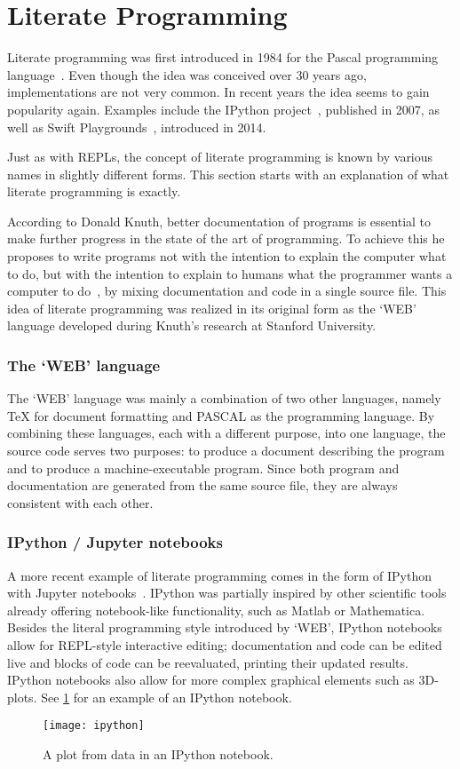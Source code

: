 \section{Literate Programming}
\label{sec:literate-programming}

Literate programming was first introduced in 1984 for the Pascal programming
language~\cite{knuth1984}. Even though the idea was conceived over 30 years
ago, implementations are not very common. In recent years the idea seems to
gain popularity again. Examples include the IPython project~\cite{ipython2007},
published in 2007, as well as Swift Playgrounds~\cite{swift-playgrounds},
introduced in 2014.

Just as with REPLs, the concept of literate programming is known by various
names in slightly different forms. This section starts with an explanation of
what literate programming is exactly.

According to Donald Knuth, better documentation of programs is essential to make
further progress in the state of the art of programming.
To achieve this he proposes to write programs not with the intention to
explain the computer what to do, but with the intention to explain to humans
what the programmer wants a computer to do~\cite{knuth1984},
by mixing documentation and code in a single source file.
This idea of literate programming was realized in its original form as the
`WEB' language developed during Knuth's research at Stanford University.

\subsubsection{The `WEB' language}

The `WEB' language was mainly a combination of two other languages, namely
\TeX{} for document formatting and PASCAL as the programming language. By
combining these languages, each with a different purpose, into one language, the
source code serves two purposes: to produce a document describing the program
and to produce a machine-executable program. Since both program and
documentation are generated from the same source file, they are always
consistent with each other.

\subsubsection{IPython / Jupyter notebooks}

A more recent example of literate programming comes in the form of IPython with
Jupyter notebooks~\cite{ipython2007}. IPython was partially inspired by other
scientific tools already offering notebook-like functionality, such as Matlab or
Mathematica. Besides the literal programming style introduced by `WEB', IPython
notebooks allow for REPL-style interactive editing; documentation and code can
be edited live and blocks of code can be reevaluated, printing their updated
results. IPython notebooks also allow for more complex graphical elements such
as 3D-plots. See \cref{fig:ipython} for an example of an IPython notebook.

\begin{figure}[htb]
  \centering
  \texttt{[image: ipython]}
  \caption{A plot from data in an IPython notebook.}
  \label{fig:ipython}
\end{figure}

